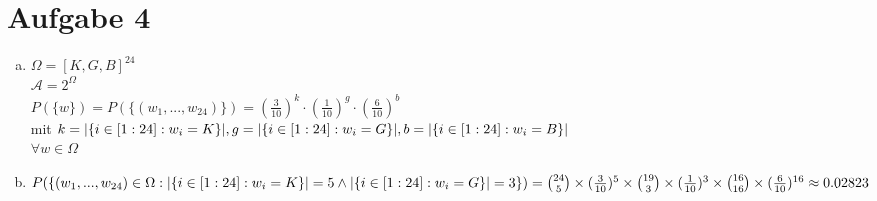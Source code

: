\documentclass[10pt,a4paper]{article}
\begin{document}
\newpage
\section*{Aufgabe 4}
\begin{enumerate}[a)]
 \item 
 $\Omega = [K,G,B]^{24}$\\
 $\mathcal{A} = 2 ^ \Omega$\\
 $P(\{w\}) = P(\{(w_1,...,w_{24})\}) = (\frac{3}{10})^k \cdot (\frac{1}{10})^g \cdot (\frac{6}{10})^b$\\
 mit $k=|\{i\in [1:24] : w_i=K\}|,\\
 g=|\{i\in [1:24] : w_i=G\}|,\\
b=|\{i\in [1:24] : w_i=B\}|$\\
$\forall w\in\Omega$
 \item
 $P(\{(w_1,...,w_{24})\in\Omega : |\{i\in [1:24]: w_i=K\}|=5 \\\land |\{i\in [1:24]: w_i=G\}|=3\})\\
 =\binom{24}{5} \times (\frac{3}{10})^5 \times \binom{19}{3} \times (\frac{1}{10})^3 \times \binom{16}{16} \times (\frac{6}{10})^{16} \approx 0.02823$
\end{enumerate}
\end{document}
